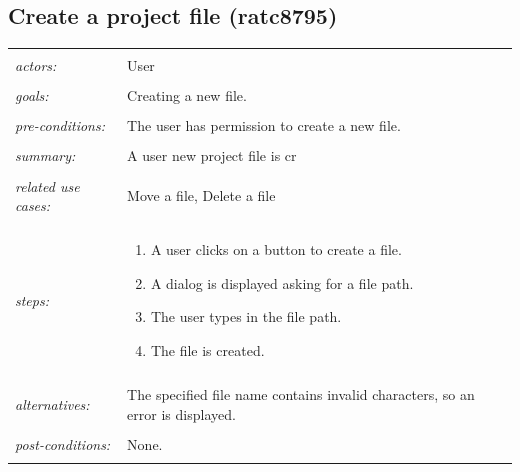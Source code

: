 \documentclass[11pt]{report}
\begin{document}
\subsection{Create a project file (ratc8795)}
\begin{tabular}{ p{2cm} p{12cm} }
 \hline
 \\
 \textit{actors:} & User \\ 
 \\
 \textit{goals:} & Creating a new file. \\
 \\
 \textit{pre-conditions:} & The user has permission to create a new file. \\
 \\
 \textit{summary:} & A user new project file is cr \\ 
 \\
 \textit{related use cases:} & Move a file, Delete a file \\ 
 \\
 \textit{steps:} & \begin{enumerate}
  \item A user clicks on a button to create a file.
  \item A dialog is displayed asking for a file path.
  \item The user types in the file path.
  \item The file is created.
 \end{enumerate} \\
 \\
 \textit{alternatives:} & The specified file name contains invalid characters, so an error is displayed. \\
 \\
 \textit{post-conditions:} & None. \\
 \\
\hline
\end{tabular}
\end{document}

